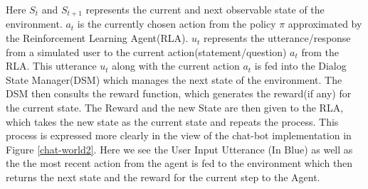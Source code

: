 \documentclass[14pt]{extarticle}
\numberwithin{equation}{section}
\begin{document}
		Here $S_t$ and $S_{t+1}$ represents the current and next observable state of the environment. $a_t$ is the currently chosen action from the policy $\pi$ approximated by the Reinforcement Learning Agent(RLA). $u_t$ represents the utterance/response from a simulated user to the current action(statement/question) $a_t$ from the RLA. This utterance $u_t$ along with the current action $a_t$ is fed into the Dialog State Manager(DSM) which manages the next state of the environment. The DSM then consults the reward function, which generates the reward(if any) for the current state. The Reward and the new State are then given to the RLA, which takes the new state as the current state and repeats the process. This process is expressed more clearly in the view of the chat-bot implementation in Figure \ref{chat-world2}. Here we see the User Input Utterance (In Blue) as well as the the most recent action from the agent is fed to the environment which then returns the next state and the reward for the current step to the Agent.
\end{document}
